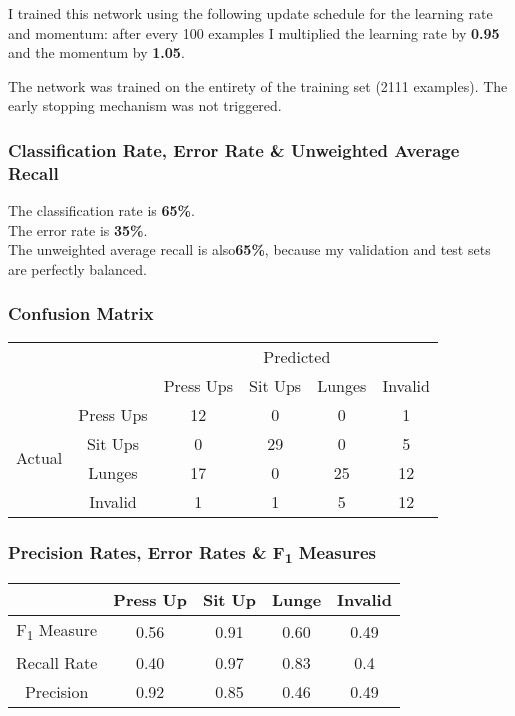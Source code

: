 \documentclass[a4paper]{article}
\begin{document}
I trained this network using the following update schedule for the learning rate and momentum: after every 100 examples I multiplied the learning rate by \textbf{0.95} and the momentum by \textbf{1.05}.

The network was trained on the entirety of the training set (2111 examples). The early stopping mechanism was not triggered.

\subsubsection{Classification Rate, Error Rate \& Unweighted Average Recall}
\label{subsubsec:ev_cp_classificationrate}

The classification rate is \textbf{65\%}.\\
The error rate is \textbf{35\%}.\\
The unweighted average recall is also\textbf{65\%}, because my validation and test sets are perfectly balanced.

\subsubsection{Confusion Matrix}
\label{subsubsec:ev_cp_confusionmatrix}

\begin{center}
\begin{tabular}{ |c|c|c|c|c|c| }
    \hline
    \multicolumn{2}{|c|}{} & \multicolumn{4}{|c|}{Predicted} \\
    \cline{3-6}
    \multicolumn{2}{|c|}{}  & Press Ups & Sit Ups & Lunges & Invalid \\
    \hline
    \multirow{4}{4em}{Actual} & Press Ups & 12 & 0 & 0 & 1 \\    
    \cline{2-6}
     & Sit Ups & 0 & 29 & 0 & 5 \\   
    \cline{2-6}
     & Lunges & 17 & 0 & 25 & 12 \\   
    \cline{2-6}
     & Invalid & 1 & 1 & 5 & 12 \\    
    \hline
\end{tabular}
\end{center}

\subsubsection{Precision Rates, Error Rates \& F\texorpdfstring{\textsubscript{1}}- Measures}
\label{subsubsec:ev_cp_rates}

\begin{center}
\begin{tabular}{ |c|c|c|c|c|}
    \hline
     & Press Up & Sit Up & Lunge & Invalid \\
    \hline
    F\texorpdfstring{\textsubscript{1}}- Measure & 0.56 & 0.91 & 0.60 & 0.49 \\
    \hline
    Recall Rate & 0.40 & 0.97 & 0.83 & 0.4\\
    \hline
    Precision & 0.92 & 0.85 & 0.46 & 0.49 \\
    \hline
\end{tabular}
\end{center}
\end{document}
